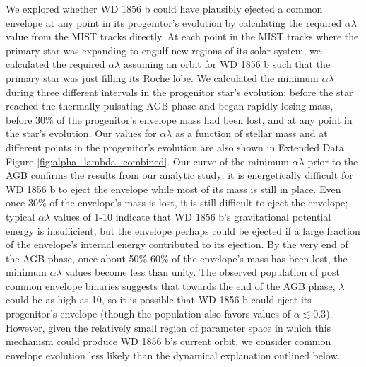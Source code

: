 \documentclass{nature3}
\newcommand*{\bedit}{\textcolor{new_black}}
\begin{document}
\begin{methods}
We explored whether WD 1856 b could have plausibly ejected a common envelope at any point in its progenitor's evolution by calculating the required $\alpha \lambda$ value from the MIST tracks directly. At each point in the MIST tracks where the primary star was expanding to engulf new regions of its solar system, we calculated the required $\alpha \lambda$ assuming an orbit for WD 1856 b such that the primary star was just filling its Roche lobe. We calculated the minimum $\alpha \lambda$ during three different intervals in the progenitor star's evolution: before the star reached the thermally pulsating AGB phase and began rapidly losing mass, before 30\% of the progenitor's envelope mass had been lost, and at any point in the star's evolution. Our values for $\alpha \lambda$ as a function of stellar mass and at different points in the progenitor's evolution are also shown in Extended Data Figure \ref{fig:alpha_lambda_combined}. Our curve of the minimum $\alpha \lambda$ prior to the AGB confirms the results from our analytic study: it is energetically difficult for WD 1856 b to eject the envelope while most of its mass is still in place. Even once 30\% of the envelope's mass is lost, it is still difficult to eject the envelope; typical $\alpha \lambda$ values of 1-10 indicate that WD 1856 b's gravitational potential energy is insufficient, but the envelope perhaps could be ejected if a large fraction of the envelope's internal energy contributed to its ejection. \bedit{By the} very end of the AGB phase, once about 50\%-60\% of the envelope's mass has been lost, the minimum $\alpha \lambda$ values become less than unity. \bedit{The observed population of post common envelope binaries suggests\cite{camacho} that towards the end of the AGB phase, $\lambda$ could be as high as 10, so it is possible that WD 1856 b could eject its progenitor's envelope (though the population also favors values of $\alpha \lesssim 0.3$). However, given the relatively small region of parameter space in which this mechanism could produce WD 1856 b's current orbit, we consider common envelope evolution less likely than the dynamical explanation outlined below. } 


\end{methods}
\end{document}
